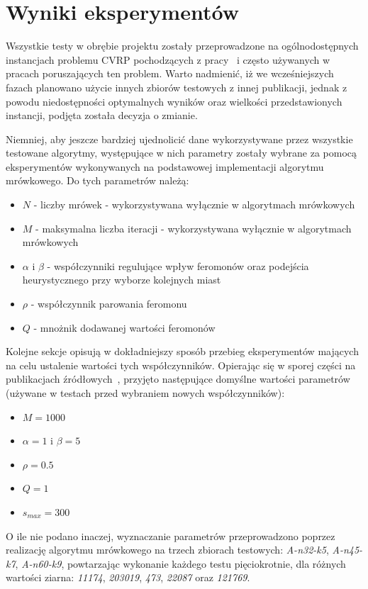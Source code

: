 \documentclass[10pt]{article}
\begin{document}
\section{Wyniki eksperymentów}
\label{sec:experiments}
Wszystkie testy w obrębie projektu zostały przeprowadzone na ogólnodostępnych instancjach problemu CVRP pochodzących z pracy~\cite{Augerat1995} i często używanych w pracach poruszających ten problem. Warto nadmienić, iż we wcześniejszych fazach planowano użycie innych zbiorów testowych z innej publikacji, jednak z powodu niedostępności optymalnych wyników oraz wielkości przedstawionych instancji, podjęta została decyzja o zmianie.

Niemniej, aby jeszcze bardziej ujednolicić dane wykorzystywane przez wszystkie testowane algorytmy, występujące w nich parametry zostały wybrane za pomocą eksperymentów wykonywanych na podstawowej implementacji algorytmu mrówkowego. Do tych parametrów należą:
\begin{itemize}
    \item $N$ - liczby mrówek - wykorzystywana wyłącznie w algorytmach mrówkowych
    \item $M$ - maksymalna liczba iteracji - wykorzystywana wyłącznie w algorytmach mrówkowych
    \item $\alpha$ i $\beta$ - współczynniki regulujące wpływ feromonów oraz podejścia heurystycznego przy wyborze kolejnych miast
    \item $\rho$ - współczynnik parowania feromonu
    \item $Q$ - mnożnik dodawanej wartości feromonów
\end{itemize}

Kolejne sekcje opisują w dokładniejszy sposób przebieg eksperymentów mających na celu ustalenie wartości tych współczynników. Opierając się w sporej części na publikacjach źródłowych~\cite{Dorigo1996}\cite{Dorigo1999}, przyjęto następujące domyślne wartości parametrów (używane w testach przed wybraniem nowych współczynników):
\begin{itemize}
    \item $M = 1000$
    \item $\alpha = 1$ i $\beta = 5$
    \item $\rho = 0.5$
    \item $Q = 1$
    \item $s_{max} = 300$
\end{itemize}

O ile nie podano inaczej, wyznaczanie parametrów przeprowadzono poprzez realizację algorytmu mrówkowego na trzech zbiorach testowych: \textit{A-n32-k5}, \textit{A-n45-k7}, \textit{A-n60-k9}, powtarzając wykonanie każdego testu pięciokrotnie, dla różnych wartości ziarna: \textit{11174}, \textit{203019}, \textit{473}, \textit{22087} oraz \textit{121769}.
\end{document}
